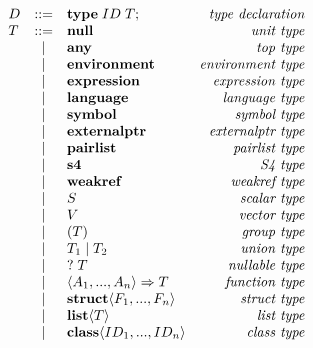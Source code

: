 \documentclass[acmsmall,review,anonymous]{acmart}\settopmatter{printfolios=true,printccs=false,printacmref=false}
\begin{document}
\label{subsec:typegrammar}

\begin{figure}          %
    \noindent           %
    \centering
    \begin{minipage}{.45\linewidth}
    \begin{flushleft}
      $ \begin{array}{lclr}
    D & ::= & {\bf type} \; ID \; T {\bf ;}  & \text{\it type declaration}\\
    T & ::= & {\bf null} & \text{\it unit type} \\
      & |   & {\bf any} & \text{\it top type} \\
      & |   & {\bf environment} & \text{\it environment type} \\
      & |   & {\bf expression} & \text{\it expression type} \\
      & |   & {\bf language} & \text{\it language type} \\
      & |   & {\bf symbol} & \text{\it symbol type} \\
      & |   & {\bf externalptr} & \text{\it externalptr type} \\
      & |   & {\bf pairlist} & \text{\it pairlist type} \\
      & |   & {\bf s4} & \text{\it S4 type} \\
      & |   & {\bf weakref} & \text{\it weakref type} \\
      & |   & S & \text{\it scalar type} \\
      & |   & V & \text{\it vector type} \\
      & |   & \left( T \right) & \text{\it group type} \\
      & |   & T_1 \; {\bf |} \; T_2 & \text{\it union type} \\
      & |   & ? \; T & \text{\it nullable type} \\
      & |   & \langle A_1 , ..., A_n\rangle \Rightarrow T & \text{\it function type} \\
      & |   & {\bf struct}\langle F_1, ..., F_n \rangle & \text{\it struct type} \\
      & |   & {\bf list} \langle T \rangle & \text{\it list type}\\
      & |   & {\bf class}\langle ID_1, ..., ID_n \rangle & \text{\it class type}\vspace{5pt}\\
    \end{array} $
    \end{flushleft}

\end{minipage}
\end{figure}
\end{document}
